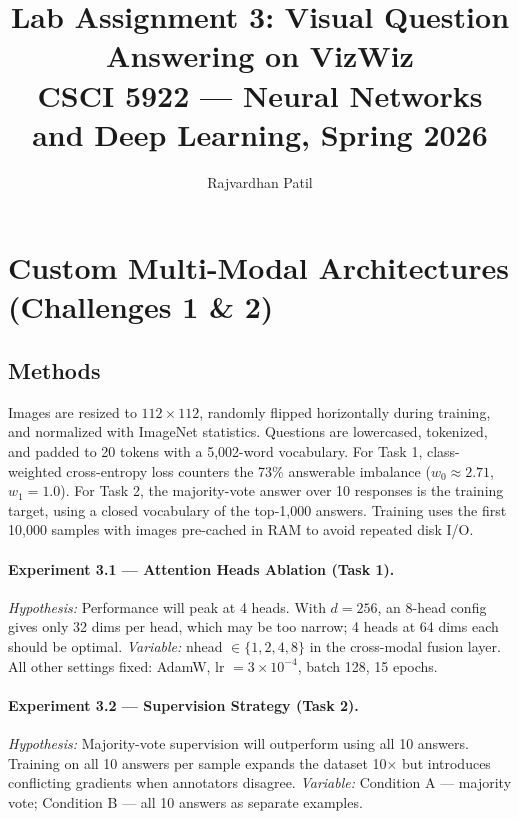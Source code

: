 \documentclass[11pt]{article}
\title{
  \textbf{Lab Assignment 3: Visual Question Answering on VizWiz}\\
  \large CSCI 5922 — Neural Networks and Deep Learning, Spring 2026
}
\author{Rajvardhan Patil}
\date{}
\begin{document}
\maketitle

\section{Custom Multi-Modal Architectures (Challenges 1 \& 2)}

\subsection{Methods}

Images are resized to $112\times112$, randomly flipped horizontally during training, and
normalized with ImageNet statistics. Questions are lowercased, tokenized, and padded to
20 tokens with a 5{,}002-word vocabulary. For Task 1, class-weighted cross-entropy loss
counters the 73\% answerable imbalance ($w_0 \approx 2.71$, $w_1 = 1.0$). For Task 2,
the majority-vote answer over 10 responses is the training target, using a closed
vocabulary of the top-1{,}000 answers. Training uses the first 10{,}000 samples with images
pre-cached in RAM to avoid repeated disk I/O.

\paragraph{Experiment 3.1 — Attention Heads Ablation (Task 1).}
\textit{Hypothesis:} Performance will peak at 4 heads. With $d=256$, an 8-head config gives
only 32 dims per head, which may be too narrow; 4 heads at 64 dims each should be optimal.
\textit{Variable:} nhead $\in \{1, 2, 4, 8\}$ in the cross-modal fusion layer.
All other settings fixed: AdamW, lr $= 3\times10^{-4}$, batch 128, 15 epochs.

\paragraph{Experiment 3.2 — Supervision Strategy (Task 2).}
\textit{Hypothesis:} Majority-vote supervision will outperform using all 10 answers.
Training on all 10 answers per sample expands the dataset 10$\times$ but introduces
conflicting gradients when annotators disagree.
\textit{Variable:} Condition A — majority vote; Condition B — all 10 answers as separate examples.
\end{document}
